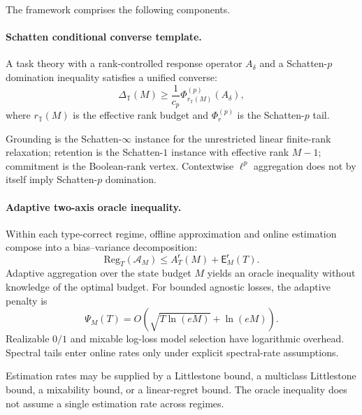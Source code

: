 \documentclass[12pt]{article}
\theoremstyle{definition}
\newcommand{\Reg}{\mathrm{Reg}}
\newcommand{\Est}{\mathsf E}
\newcommand{\Aapp}{A_T}
\newcommand{\PsiAgg}{\Psi}
\begin{document}
The framework comprises the following components.

\paragraph{Schatten conditional converse template.}
A task theory with a rank-controlled response operator $A_\delta$ and a
Schatten-$p$ domination inequality satisfies a unified converse:
\[
\Delta_{\mathbb T}(M)
\ge
\frac1{c_p}
\Phi^{(p)}_{r_{\mathbb T}(M)}(A_\delta),
\]
where $r_{\mathbb T}(M)$ is the effective rank budget and
$\Phi^{(p)}_r$ is the Schatten-$p$ tail.

Grounding is the Schatten-$\infty$ instance for the unrestricted linear
finite-rank relaxation; retention is the Schatten-$1$ instance with effective
rank $M-1$; commitment is the Boolean-rank vertex.  Contextwise $\ell^p$
aggregation does not by itself imply Schatten-$p$ domination.

\paragraph{Adaptive two-axis oracle inequality.}
Within each type-correct regime, offline approximation and online estimation
compose into a bias--variance decomposition:
\[
\Reg_T(\mathcal A_M)
\le
\Aapp^{\mathsf r}(M)
+
\Est_M^{\mathsf r}(T).
\]
Adaptive aggregation over the state budget $M$ yields an oracle inequality
without knowledge of the optimal budget.  For bounded agnostic losses, the
adaptive penalty is
\[
\PsiAgg_M(T)
=
O\!\left(
\sqrt{T\ln(eM)}
+
\ln(eM)
\right).
\]
Realizable $0/1$ and mixable log-loss model selection have logarithmic
overhead.  Spectral tails enter online rates only under explicit spectral-rate
assumptions.

Estimation rates may be supplied by a Littlestone bound, a multiclass
Littlestone bound, a mixability bound, or a linear-regret bound.  The oracle
inequality does not assume a single estimation rate across regimes.
\end{document}
